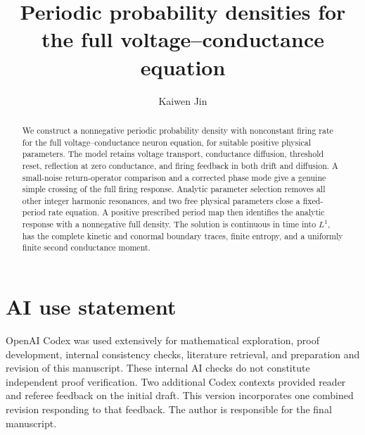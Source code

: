 \documentclass[11pt]{amsart}
\title[Periodic voltage--conductance densities]{Periodic probability densities
for the full voltage--conductance equation}
\author{Kaiwen Jin}
\date{}
\begin{document}
\begin{abstract}
We construct a nonnegative periodic probability density with nonconstant
firing rate for the full voltage--conductance neuron equation, for
suitable positive physical parameters. The model retains voltage
transport, conductance diffusion, threshold reset, reflection at zero
conductance, and firing feedback in both drift and diffusion.
A small-noise return-operator comparison and a corrected phase mode
give a genuine simple crossing of the full firing response.
Analytic parameter selection removes all other integer harmonic
resonances, and two free physical parameters close a fixed-period
rate equation. A positive prescribed period map then identifies
the analytic response with a nonnegative full density. The solution
is continuous in time into $L^1$, has the complete kinetic and
conormal boundary traces, finite entropy, and a uniformly finite
second conductance moment.
\end{abstract}

\maketitle






\appendix



\section*{AI use statement}
OpenAI Codex was used extensively for mathematical exploration,
proof development, internal consistency checks, literature retrieval,
and preparation and revision of this manuscript. These internal AI
checks do not constitute independent proof verification.
Two additional Codex contexts provided reader and referee feedback
on the initial draft. This version incorporates one combined
revision responding to that feedback.
The author is responsible for the final manuscript.


\end{document}

